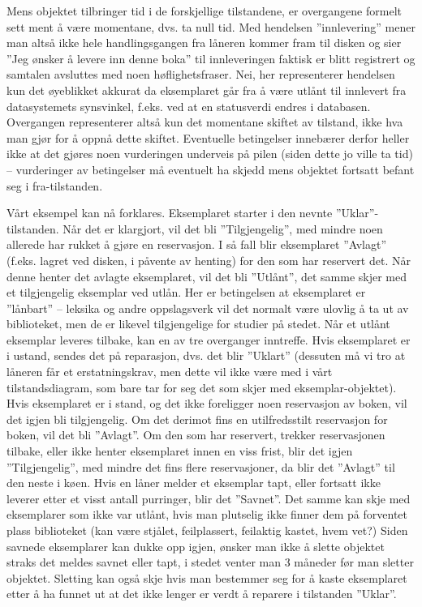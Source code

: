 Mens objektet tilbringer tid i de forskjellige tilstandene, er overgangene formelt sett ment å være momentane, dvs. ta null tid. Med hendelsen ”innlevering” mener man altså ikke hele handlingsgangen fra låneren kommer fram til disken og sier ”Jeg ønsker å levere inn denne boka” til innleveringen faktisk er blitt registrert og samtalen avsluttes med noen høflighetsfraser. Nei, her representerer hendelsen kun det øyeblikket akkurat da eksemplaret går fra å være utlånt til innlevert fra datasystemets synsvinkel, f.eks. ved at en statusverdi endres i databasen. Overgangen representerer altså kun det momentane skiftet av tilstand, ikke hva man gjør for å oppnå dette skiftet. Eventuelle betingelser innebærer derfor heller ikke at det gjøres noen vurderingen underveis på pilen (siden dette jo ville ta tid) – vurderinger av betingelser må eventuelt ha skjedd mens objektet fortsatt befant seg i fra-tilstanden.

Vårt eksempel kan nå forklares. Eksemplaret starter i den nevnte ”Uklar”-tilstanden. Når det er klargjort, vil det bli ”Tilgjengelig”, med mindre noen allerede har rukket å gjøre en reservasjon. I så fall blir eksemplaret ”Avlagt” (f.eks. lagret ved disken, i påvente av henting) for den som har reservert det. Når denne henter det avlagte eksemplaret, vil det bli ”Utlånt”, det samme skjer med et tilgjengelig eksemplar ved utlån. Her er betingelsen at eksemplaret er ”lånbart” – leksika og andre oppslagsverk vil det normalt være ulovlig å ta ut av biblioteket, men de er likevel tilgjengelige for studier på stedet. Når et utlånt eksemplar leveres tilbake, kan en av tre overganger inntreffe. Hvis eksemplaret er i ustand, sendes det på reparasjon, dvs. det blir ”Uklart” (dessuten må vi tro at låneren får et erstatningskrav, men dette vil ikke være med i vårt tilstandsdiagram, som bare tar for seg det som skjer med eksemplar-objektet). Hvis eksemplaret er i stand, og det ikke foreligger noen reservasjon av boken, vil det igjen bli tilgjengelig. Om det derimot fins en utilfredsstilt reservasjon for boken, vil det bli ”Avlagt”. Om den som har reservert, trekker reservasjonen tilbake, eller ikke henter eksemplaret innen en viss frist, blir det igjen ”Tilgjengelig”, med mindre det fins flere reservasjoner, da blir det ”Avlagt” til den neste i køen. Hvis en låner melder et eksemplar tapt, eller fortsatt ikke leverer etter et visst antall purringer, blir det ”Savnet”. Det samme kan skje med eksemplarer som ikke var utlånt, hvis man plutselig ikke finner dem på forventet plass biblioteket (kan være stjålet, feilplassert, feilaktig kastet, hvem vet?) Siden savnede eksemplarer kan dukke opp igjen, ønsker man ikke å slette objektet straks det meldes savnet eller tapt, i stedet venter man 3 måneder før man sletter objektet. Sletting kan også skje hvis man bestemmer seg for å kaste eksemplaret etter å ha funnet ut at det ikke lenger er verdt å reparere i tilstanden ”Uklar”.

